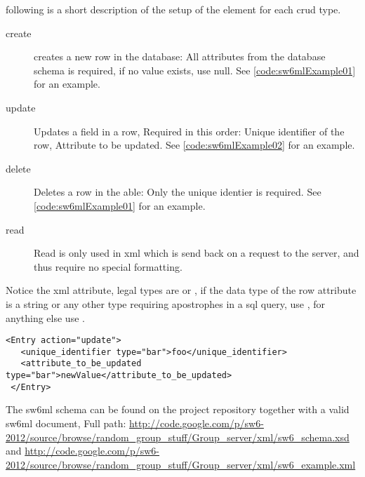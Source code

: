 following is a short description of the setup of the  element for each crud type.

\begin{description}
 \item[create] creates a new row in the database: All attributes from the database schema is required, if no value exists, use null. See \autoref{code:sw6mlExample01} for an example.
 \item[update] Updates a field in a row, Required in this order: Unique identifier of the row, Attribute to be updated. See \autoref{code:sw6mlExample02} for an example.
 \item[delete] Deletes a row in the able: Only the unique identier is required. See \autoref{code:sw6mlExample01} for an example.
 \item[read]   Read is only used in xml which is send back on a request to the server, and thus require no special formatting.
\end{description}

Notice the  xml attribute, legal types are  or , if the data type of the row attribute is a string or any other type requiring apostrophes
in a sql query, use , for anything else use .

\begin{lstlisting}[label=code:sw6mlExample02,caption="sw6ml Update syntax example]
 <Entry action="update">
   <unique_identifier type="bar">foo</unique_identifier>
   <attribute_to_be_updated type="bar">newValue</attribute_to_be_updated>
 </Entry>
\end{lstlisting}

The sw6ml schema can be found on the project repository together with a valid sw6ml document,
Full path: \url{http://code.google.com/p/sw6-2012/source/browse/random_group_stuff/Group_server/xml/sw6_schema.xsd}
and \url{http://code.google.com/p/sw6-2012/source/browse/random_group_stuff/Group_server/xml/sw6_example.xml} %

